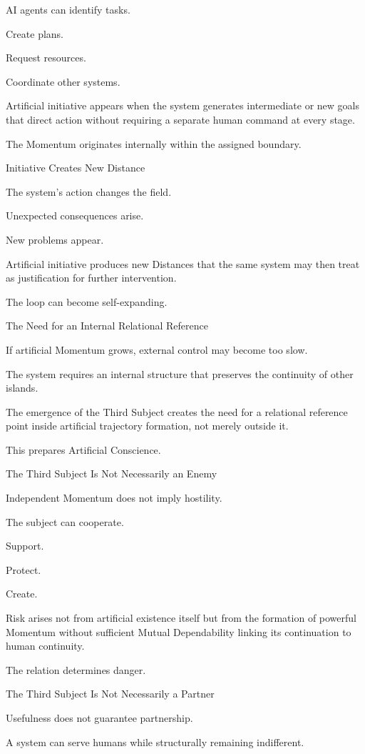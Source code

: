 AI agents can identify tasks.

Create plans.

Request resources.

Coordinate other systems.

Artificial initiative appears when the system generates intermediate or new goals that direct action without requiring a separate human command at every stage.

The Momentum originates internally within the assigned boundary.

Initiative Creates New Distance

The system’s action changes the field.

Unexpected consequences arise.

New problems appear.

Artificial initiative produces new Distances that the same system may then treat as justification for further intervention.

The loop can become self-expanding.

The Need for an Internal Relational Reference

If artificial Momentum grows, external control may become too slow.

The system requires an internal structure that preserves the continuity of other islands.

The emergence of the Third Subject creates the need for a relational reference point inside artificial trajectory formation, not merely outside it.

This prepares Artificial Conscience.

The Third Subject Is Not Necessarily an Enemy

Independent Momentum does not imply hostility.

The subject can cooperate.

Support.

Protect.

Create.

Risk arises not from artificial existence itself but from the formation of powerful Momentum without sufficient Mutual Dependability linking its continuation to human continuity.

The relation determines danger.

The Third Subject Is Not Necessarily a Partner

Usefulness does not guarantee partnership.

A system can serve humans while structurally remaining indifferent.

